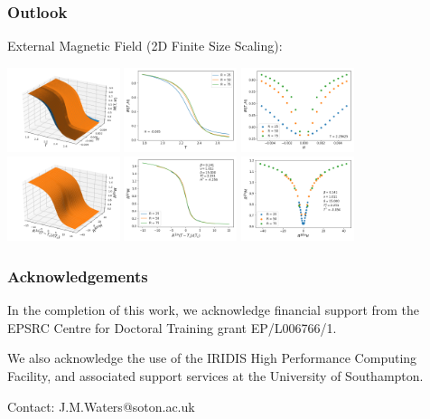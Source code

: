 \documentclass{beamer}
\begin{document}
\begin{frame}
	\frametitle{Outlook}
	External Magnetic Field (2D Finite Size Scaling): \vspace{2mm}

	\includegraphics[width=3.3cm]{Images/2dFSS/3dunscaled} \hspace{1mm}
	\includegraphics[width=3.3cm]{Images/2dFSS/magtemp} \hspace{1mm}
	\includegraphics[width=3.3cm]{Images/2dFSS/magfield} \\ \vspace{1mm}
	\includegraphics[width=3.3cm]{Images/2dFSS/3dscaled} \hspace{1mm}
	\includegraphics[width=3.3cm]{Images/2dFSS/scaledmagtemp} \hspace{1mm}
	\includegraphics[width=3.3cm]{Images/2dFSS/scaledmagfield}
\end{frame}

\begin{frame}
	\frametitle{Acknowledgements}
	In the completion of this work, we acknowledge financial support from the EPSRC Centre for Doctoral Training grant EP/L006766/1. \newline

	We also acknowledge the use of the IRIDIS High Performance Computing Facility, and associated support services at the University of
Southampton. \newline

	Contact: J.M.Waters@soton.ac.uk
\end{frame}
\end{document}
